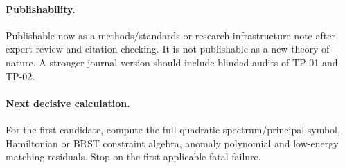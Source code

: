\documentclass[11pt,a4paper]{article}
\begin{document}
\paragraph{Publishability.}  Publishable now as a methods/standards or research-infrastructure note after expert review and citation checking.  It is not publishable as a new theory of nature.  A stronger journal version should include blinded audits of TP-01 and TP-02.

\paragraph{Next decisive calculation.}  For the first candidate, compute the full quadratic spectrum/principal symbol, Hamiltonian or BRST constraint algebra, anomaly polynomial and low-energy matching residuals.  Stop on the first applicable fatal failure.

\appendix


\printbibliography
\end{document}
